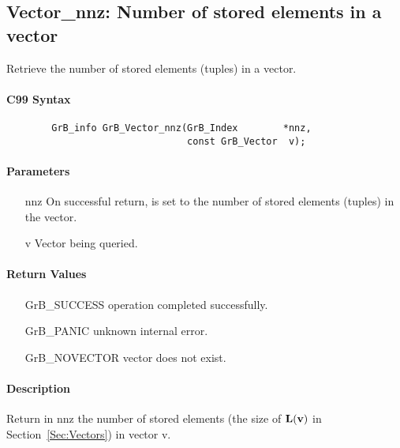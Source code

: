 \subsection{{\sf Vector\_nnz}: Number of stored elements in a vector}

Retrieve the number of stored elements (tuples) in a vector.

\paragraph{C99 Syntax}

\begin{verbatim}
        GrB_info GrB_Vector_nnz(GrB_Index        *nnz,
                                const GrB_Vector  v);
\end{verbatim}

\paragraph{Parameters}

\begin{itemize}[leftmargin=1.1in]
    \item[{\sf nnz}] On successful return, is set to the number of stored elements (tuples)
    in the vector.
    \item[{\sf v}] Vector being queried.
\end{itemize}


\paragraph{Return Values}

\begin{itemize}[leftmargin=2.1in]
\item[{\sf GrB\_SUCCESS}]   operation completed successfully.
\item[{\sf GrB\_PANIC}]     unknown internal error.
\item[{\sf GrB\_NOVECTOR}]  vector does not exist.
\end{itemize}

\paragraph{Description}

Return in {\sf nnz} the number of stored elements (the size of $\bold{L}({\bf v})$
in Section~\ref{Sec:Vectors}) in vector {\sf v}.



